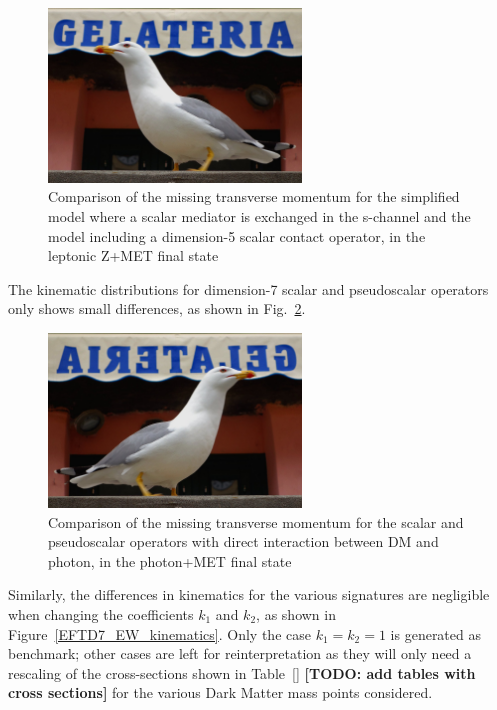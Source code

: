 \begin{figure}
    \includegraphics[width=0.6\textwidth]{figures/gull}
    \caption{Comparison of the missing transverse momentum for the simplified model
    where a scalar mediator is exchanged in the s-channel and the model including 
    a dimension-5 scalar contact operator, in the leptonic Z+MET final state}
    \label{fig:EW_EFT5_Zlep_MET}
\end{figure}

The kinematic distributions for dimension-7 scalar and pseudoscalar operators 
only shows small differences, as shown in Fig.~\ref{fig:EW_EFT5_gamma_MET}. 

\begin{figure}
    \includegraphics[width=0.6\textwidth]{figures/llug}
    \caption{Comparison of the missing transverse momentum for the scalar and pseudoscalar
    operators with direct interaction between DM and photon, in the photon+MET final state}
    \label{fig:EW_EFT5_gamma_MET}
\end{figure}

Similarly, the differences in kinematics for the various signatures 
are negligible when changing the coefficients $k_1$ and $k_2$, as shown
in Figure~\ref{EFTD7_EW_kinematics}. Only the case $k_1=k_2=1$ is generated as benchmark; 
other cases are left for reinterpretation as they will only need a rescaling of the cross-sections
shown in Table~\ref{} \textbf{[TODO: add tables with cross sections]} for the various Dark Matter
mass points considered. 

